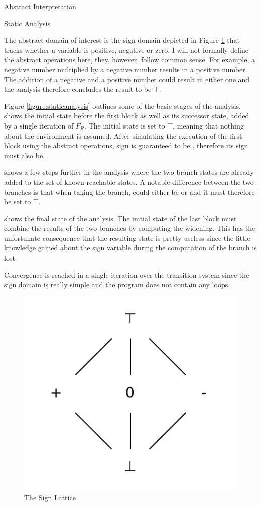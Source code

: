 \begin{chapter}{Abstract Interpretation}
\begin{section}{Static Analysis}
\begin{example}
			The abstract domain of interest is the sign domain depicted in Figure \ref{figure:signlattice} that tracks whether a variable is positive, negative or zero. I will not formally define the abstract operations here, they, however, follow common sense. For example, a negative number multiplied by a negative number results in a positive number. The addition of a negative and a positive number could result in either one and the analysis therefore concludes the result to be $\top$.

			Figure \ref{figure:staticanalysis} outlines some of the basic stages of the analysis. \one shows the initial state before the first block as well as its successor state, added by a single iteration of $F_R$. The initial state is set to $\top$, meaning that nothing about the environment is assumed. After simulating the execution of the first block using the abstract operations, sign is guaranteed to be , therefore its sign must also be .
			
			\two shows a few steps further in the analysis where the two branch states are already added to the set of known reachable states. A notable difference between the two branches is that when taking the  branch, \cx could either be  or \code{+} and it must therefore be set to $\top$.

			\three shows the final state of the analysis. The initial state of the last block must combine the results of the two branches by computing the widening. This has the unfortunate consequence that the resulting state is pretty useless since the little knowledge gained about the sign variable during the computation of the branch is lost.

			Convergence is reached in a single iteration over the transition system since the sign domain is really simple and the program does not contain any loops. 
			\exampleend

			\begin{figure}
				\centering
				\includegraphics[scale=0.8]{Graphs/SignLattice.pdf}
				\caption{The Sign Lattice}
				\label{figure:signlattice}
			\end{figure}


\end{example}
\end{section}
\end{chapter}
